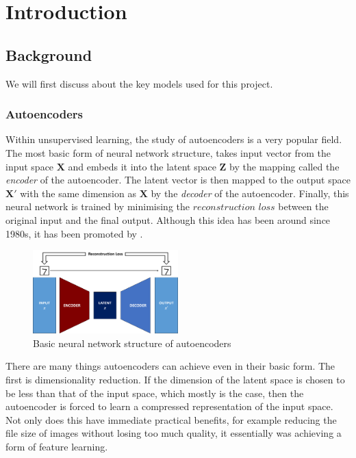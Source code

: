 \chapter{Introduction}

    \section{Background}
        We will first discuss about the key models used for this project.
        
        \subsection{Autoencoders}
            Within unsupervised learning, the study of autoencoders is a very popular field. The most basic form of neural network structure,  takes input vector from the input space $\bm{X}$ and embeds it into the latent space $\bm{Z}$ by the mapping called the \textit{encoder} of the autoencoder. The latent vector is then mapped to the output space $\bm{X'}$ with the same dimension as $\bm{X}$ by the \textit{decoder} of the autoencoder. Finally, this neural network is trained by minimising the $\textit{reconstruction loss}$ between the original input and the final output. Although this idea has been around since 1980s, it has been promoted by \cite{HintonSalakhutdinov2006b}.
            
            \begin{figure}[H] \label{fig:ae}
                \centering
                \includegraphics[width=0.5\textwidth]{imgs/autoencoder.png}
                \caption{Basic neural network structure of autoencoders}
            \end{figure}
            
            There are many things autoencoders can achieve even in their basic form. The first is dimensionality reduction. If the dimension of the latent space is chosen to be less than that of the input space, which mostly is the case, then the autoencoder is forced to learn a compressed representation of the input space. Not only does this have immediate practical benefits, for example reducing the file size of images without losing too much quality, it essentially was achieving a form of feature learning.
            
